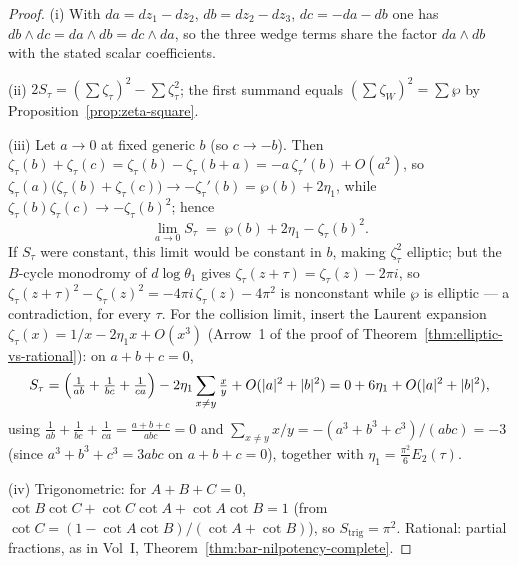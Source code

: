 \begin{proof}
(i) With $da = dz_1 - dz_2$, $db = dz_2 - dz_3$, $dc = -da - db$ one
has $db \wedge dc = da \wedge db = dc \wedge da$, so the three wedge
terms share the factor $da \wedge db$ with the stated scalar
coefficients.

(ii) $2S_\tau = (\sum\zeta_\tau)^2 - \sum\zeta_\tau^2$; the first
summand equals $(\sum\zeta_W)^2 = \sum\wp$ by
Proposition~\ref{prop:zeta-square}.

(iii) Let $a \to 0$ at fixed generic $b$ (so $c \to -b$). Then
$\zeta_\tau(b) + \zeta_\tau(c) = \zeta_\tau(b) - \zeta_\tau(b{+}a)
= -a\,\zeta_\tau'(b) + O(a^2)$, so
$\zeta_\tau(a)\bigl(\zeta_\tau(b)+\zeta_\tau(c)\bigr) \to
-\zeta_\tau'(b) = \wp(b) + 2\eta_1$, while
$\zeta_\tau(b)\zeta_\tau(c) \to -\zeta_\tau(b)^2$; hence
\[
\lim_{a \to 0} S_\tau \;=\; \wp(b) + 2\eta_1 - \zeta_\tau(b)^2 .
\]
If $S_\tau$ were constant, this limit would be constant in $b$,
making $\zeta_\tau^2$ elliptic; but the $B$-cycle monodromy of
$d\log\theta_1$ gives $\zeta_\tau(z + \tau) = \zeta_\tau(z) - 2\pi i$,
so $\zeta_\tau(z{+}\tau)^2 - \zeta_\tau(z)^2 = -4\pi i\,\zeta_\tau(z)
- 4\pi^2$ is nonconstant while $\wp$ is elliptic --- a contradiction,
for every $\tau$. For the collision limit, insert the Laurent
expansion $\zeta_\tau(x) = 1/x - 2\eta_1 x + O(x^3)$ (Arrow~1 of the
proof of Theorem~\ref{thm:elliptic-vs-rational}): on $a + b + c = 0$,
\[
S_\tau = \Bigl(\tfrac{1}{ab} + \tfrac{1}{bc} + \tfrac{1}{ca}\Bigr)
- 2\eta_1 \sum_{x \neq y}\tfrac{x}{y} + O(|a|^2+|b|^2)
= 0 + 6\eta_1 + O(|a|^2+|b|^2),
\]
using $\tfrac{1}{ab} + \tfrac{1}{bc} + \tfrac{1}{ca} =
\tfrac{a+b+c}{abc} = 0$ and $\sum_{x \neq y} x/y =
-(a^3{+}b^3{+}c^3)/(abc) = -3$ (since $a^3+b^3+c^3 = 3abc$ on
$a+b+c=0$), together with $\eta_1 = \tfrac{\pi^2}{6}E_2(\tau)$.

(iv) Trigonometric: for $A+B+C = 0$,
$\cot B\cot C + \cot C\cot A + \cot A\cot B = 1$ (from
$\cot C = (1 - \cot A\cot B)/(\cot A + \cot B)$), so
$S_{\mathrm{trig}} = \pi^2$. Rational: partial fractions, as in
Vol~I, Theorem~\ref{thm:bar-nilpotency-complete}.
\end{proof}


